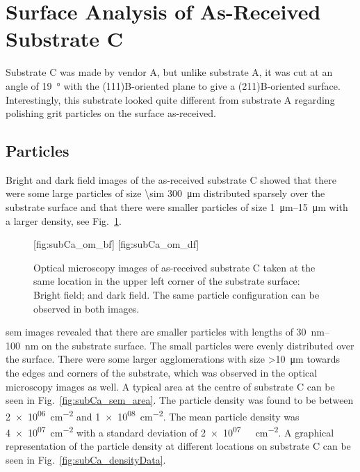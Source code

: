 \clearpage
\section{Surface Analysis of As-Received Substrate C}\label{sec:subCa}
Substrate C was made by vendor A, but unlike substrate A, it was cut at an angle of \SI{19}{\degree} with the (111)B-oriented plane to give a (211)B-oriented surface. Interestingly, this substrate looked quite different from substrate A regarding polishing grit particles on the surface as-received.

\subsection{Particles}
Bright and dark field images of the as-received substrate C showed that there were some large particles of size \SI{\sim 300}{\micro\metre} distributed sparsely over the substrate surface and that there were smaller particles of size \SIrange{1}{15}{\micro\metre} with a larger density, see Fig.~\ref{fig:subCa_om}. %

\begin{figure}[htbp]
    \centering
    [fig:subCa_om_bf]
    \hfill
    [fig:subCa_om_df]
    \caption[Bright and dark field optical microscopy images of as-received substrate C.]{Optical microscopy images of as-received substrate C taken at the same location in the upper left corner of the substrate surface:  Bright field; and  dark field. The same particle configuration can be observed in both images.}
    \label{fig:subCa_om}
\end{figure}

\Ac{sem} images revealed that there are smaller particles with lengths of \SIrange{30}{100}{\nano\metre} on the substrate surface. The small particles were evenly distributed over the surface. There were some larger agglomerations with size \SI{>10}{\micro\metre} towards the edges and corners of the substrate, which was observed in the optical microscopy images as well. A typical area at the centre of substrate C can be seen in Fig.~\ref{fig:subCa_sem_area}. The particle density was found to be between \SI{2e+06}{\centi\metre^{-2}} and \SI{1e+08}{\centi\metre^{-2}}. The mean particle density was \SI{4e+07}{\centi\metre^{-2}} with a standard deviation of \SI{2e+07}{\
\centi\metre^{-2}}. A graphical representation of the particle density at different locations on substrate C can be seen in Fig.~\ref{fig:subCa_densityData}.

